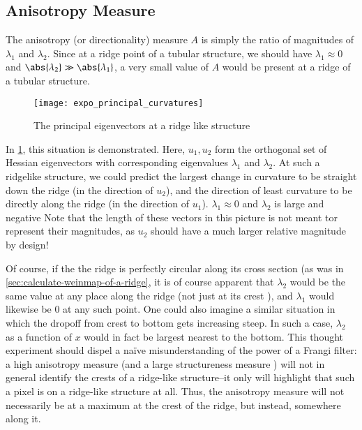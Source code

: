 \subsection{Anisotropy Measure} \label{sec:frangi.anisotropy}
The anisotropy (or directionality) measure $A$ is simply the ratio of magnitudes of $\lambda_1$ and $\lambda_2$. Since at a ridge point of a tubular structure, we should have $\lambda_1 \approx 0$ and $\abs{\lambda_2} \gg \abs{\lambda_1}$,
a very small value of $A$ would be present at a ridge of a tubular structure.

\begin{figure} \centering
  \texttt{[image: expo\_principal\_curvatures]}
  \caption{The principal eigenvectors at a ridge like structure} 
  \label{fig:expo-principal-curvatures}
\end{figure}

In \cref{fig:expo-principal-curvatures}, this situation is demonstrated. Here, $u_1, u_2$ form the orthogonal set of Hessian eigenvectors with corresponding eigenvalues $\lambda_1$ and $\lambda_2$. At such a ridgelike structure, we could predict the largest change in curvature to be straight down the ridge (in the direction of $u_2$), and the direction of least curvature to be directly along the ridge (in the direction  of $u_1$). $\lambda_1 \approx 0$ and $\lambda_2$ is large and negative  Note that the length of these vectors in this picture is not meant tor represent their magnitudes, as $u_2$ should have a much larger relative magnitude by design!

Of course, if the the ridge is perfectly circular along its cross section (as was in \cref{sec:calculate-weinmap-of-a-ridge}, it is of course apparent that $\lambda_2$ would be the same value at any place along the ridge (not just at its crest ), and $\lambda_1$ would likewise be 0 at any such point.  One could also imagine a similar situation in which the dropoff from crest to bottom gets increasing steep. In such a case, $\lambda_2$ as a function of $x$ would in fact be largest nearest to the bottom. This thought experiment should dispel a na\"{i}ve misunderstanding of the power of a Frangi filter: a high anisotropy measure (and a large structureness measure ) will not in general identify the crests of a ridge-like structure--it only will highlight that such a pixel is on a ridge-like structure at all. Thus, the anisotropy measure will not necessarily be at a maximum at the crest of the ridge, but instead, somewhere along it.

